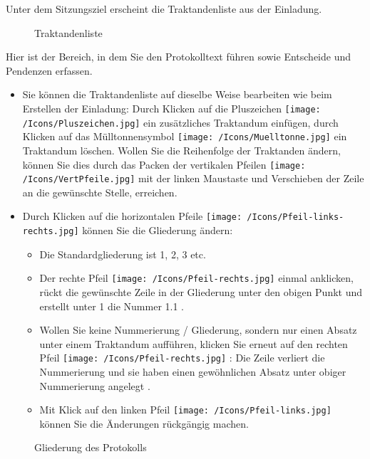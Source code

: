 Unter dem Sitzungsziel erscheint die Traktandenliste aus der Einladung.

\begin{figure}[H]
\caption{Traktandenliste}
\end{figure}

Hier ist der Bereich, in dem Sie den Protokolltext führen sowie Entscheide und Pendenzen erfassen.

\begin{itemize}
\item
Sie können die Traktandenliste auf dieselbe Weise bearbeiten wie beim Erstellen der Einladung: Durch Klicken auf die Pluszeichen \texttt{[image: /Icons/Pluszeichen.jpg]}  ein zusätzliches Traktandum einfügen, durch Klicken auf das Mülltonnensymbol \texttt{[image: /Icons/Muelltonne.jpg]}  ein Traktandum löschen. Wollen Sie die Reihenfolge der Traktanden ändern, können Sie dies durch das Packen der vertikalen Pfeilen \texttt{[image: /Icons/VertPfeile.jpg]}  mit der linken Maustaste und Verschieben der Zeile an die gewünschte Stelle, erreichen.
\item
Durch Klicken auf die horizontalen Pfeile \texttt{[image: /Icons/Pfeil-links-rechts.jpg]}  können Sie die Gliederung ändern:

	\begin{itemize}
		\item
		Die Standardgliederung ist 1, 2, 3 etc. 
		\item
		Der rechte Pfeil \texttt{[image: /Icons/Pfeil-rechts.jpg]}  einmal anklicken, rückt die gewünschte Zeile in der Gliederung unter den obigen Punkt und erstellt unter 1 die Nummer 1.1 .
		\item
		Wollen Sie keine Nummerierung / Gliederung, sondern nur einen Absatz unter einem Traktandum aufführen, klicken Sie erneut auf den rechten Pfeil \texttt{[image: /Icons/Pfeil-rechts.jpg]} : Die Zeile verliert die Nummerierung und sie haben einen gewöhnlichen Absatz unter obiger Nummerierung angelegt .
		\item
		Mit Klick auf den linken Pfeil \texttt{[image: /Icons/Pfeil-links.jpg]}  können Sie die Änderungen rückgängig machen.
	\end{itemize}
\end{itemize}

\begin{figure}[H]
\caption{Gliederung des Protokolls}
\end{figure}

